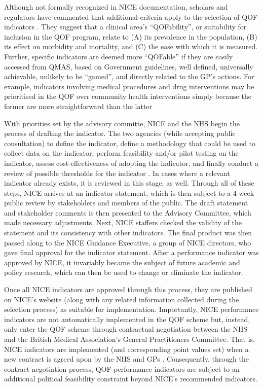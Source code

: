 \documentclass[12pt]{article}
\begin{document}
Although not formally recognized in NICE documentation, scholars and regulators have commented that additional criteria apply to the selection of QOF indicators \citep{campbellDevelopingIndicatorsConcept2010,gillamQualityOutcomesFramework2013}. They suggest that a clinical area's ``QOFability'', or suitability for inclusion in the QOF program, relate to (A) its prevalence in the population, (B) its effect on morbidity and mortality, and (C) the ease with which it is measured. Further, specific indicators are deemed more ``QOFable'' if they are easily accessed from QMAS, based on Government guidelines, well defined, universally achievable, unlikely to be ``gamed'', and directly related to the GP's actions. For example, indicators involving medical procedures and drug interventions may be prioritised in the QOF over community health interventions simply because the former are more straightforward than the latter \citep{gillamQualityOutcomesFramework2013}

With priorities set by the advisory committe, NICE and the NHS begin the process of drafting the indicator. The two agencies (while accepting public consultation) to define the indicator, define a methodology that could be used to collect data on the indicator, perform feasibility and/or pilot testing on the indicator, assess cost-effectiveness of adopting the indicator, and finally conduct a review of possible thresholds for the indicator \citep{campbellFrameworkIndicatorTesting2011}. In cases where a relevant indicator already exists, it is reviewed in this stage, as well. Through all of these steps, NICE arrives at an indicator statement, which is then subject to a 4-week public review by stakeholders and members of the public. The draft statement and stakeholder comments is then presented to the Advisory Committee, which made necessary adjustments. Next, NICE staffers checked the validity of the statement and its consistency with other indicators. The final product was then passed along to the NICE Guidance Executive, a group of NICE directors, who gave final approval for the indicator statement. After a performance indicator was approved by NICE, it invariably became the subject of future academic and policy research, which can then be used to change or eliminate the indicator.

Once all NICE indicators are approved through this process, they are published on NICE's website (along with any related information collected during the selection process) as suitable for implementation. Importantly, NICE performance indicators are not automatically implemented in the QOF scheme but, instead, only enter the QOF scheme through contractual negotiation between the NHS and the British Medical Association's General Practitioners Committee. That is, NICE indicators are implemented (and corresponding point values set) when a new contract is agreed upon by the NHS and GPs \citep{nhsengland201920General2019}. Consequently, through the contract negotiation process, QOF performance indicators are subject to an additional political feasibility constraint beyond NICE's recommended indicators.
\end{document}
